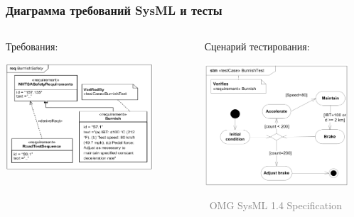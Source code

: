 \documentclass[xetex,mathserif,serif]{beamer}
\newcommand{\attribution}[1] {
	\vspace{-5mm}\begin{flushright}\begin{scriptsize}\textcolor{gray}{\textcopyright\, #1}\end{scriptsize}\end{flushright}
}
\begin{document}
	\begin{frame}
		\frametitle{Диаграмма требований SysML и тесты}
		\begin{columns}
			\begin{column}{0.5\textwidth}
				Требования:
				\begin{center}
					\includegraphics[width=0.8\textwidth]{sysMlRequirementsTest.png}
				\end{center}
			\end{column}
			\begin{column}{0.5\textwidth}
				Сценарий тестирования:
				\begin{center}
					\includegraphics[width=0.9\textwidth]{sysMlRequirementsTestActivity.png}
					\attribution{OMG SysML 1.4 Specification}
				\end{center}
			\end{column}
		\end{columns}
	\end{frame}
\end{document}
